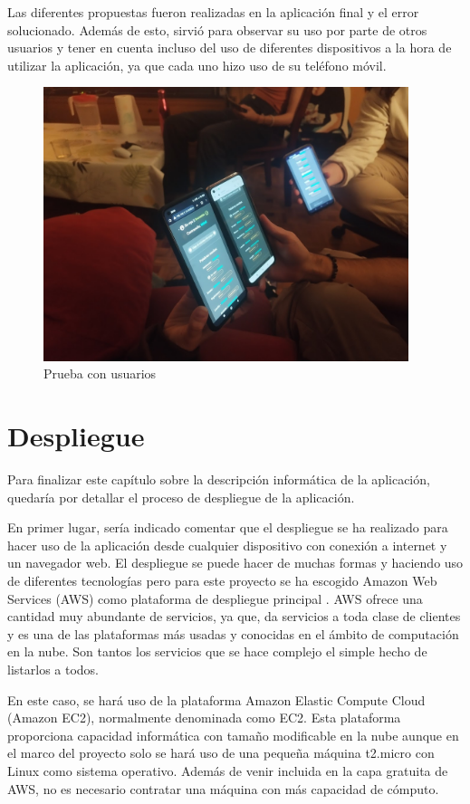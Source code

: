 Las diferentes propuestas fueron realizadas en la aplicación final y el error solucionado. Además de esto, sirvió para observar su uso por parte de otros usuarios
y tener en cuenta incluso del uso de diferentes dispositivos a la hora de utilizar la aplicación, ya que cada uno hizo uso de su teléfono móvil.

\begin{figure}[h]
	\centering
	\includegraphics[height=8cm,clip=true]{res_prueba.jpg}
	\caption{Prueba con usuarios}
	\label{fig:res_prueba}
\end{figure}




\section{Despliegue}

Para finalizar este capítulo sobre la descripción informática de la aplicación, quedaría por detallar el proceso de despliegue de la 
aplicación.

En primer lugar, sería indicado comentar que el despliegue se ha realizado para hacer uso de la aplicación desde cualquier dispositivo
con conexión a internet y un navegador web. El despliegue se puede hacer de muchas formas y haciendo uso de diferentes tecnologías pero para 
este proyecto se ha escogido Amazon Web Services (AWS) como plataforma de despliegue principal \cite{aws}. AWS ofrece una cantidad muy abundante
de servicios, ya que, da servicios a toda clase de clientes y es una de las plataformas más usadas y conocidas en el ámbito de 
computación en la nube. Son tantos los servicios que se hace complejo el simple hecho de listarlos a todos.

En este caso, se hará uso de la plataforma Amazon Elastic Compute Cloud (Amazon EC2), normalmente denominada como EC2. Esta plataforma
proporciona capacidad informática con tamaño modificable en la nube aunque en el marco del proyecto solo se hará uso de una pequeña máquina
t2.micro con Linux como sistema operativo. Además de venir incluida en la capa gratuita de AWS, no es necesario contratar 
una máquina con más capacidad de cómputo. 

